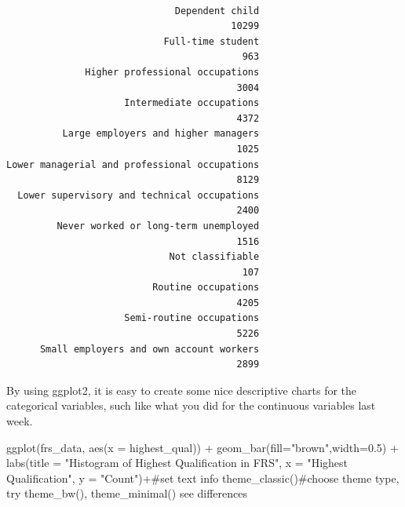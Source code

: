 \documentclass[
  letterpaper,
  DIV=11,
  numbers=noendperiod]{scrreprt}
\newenvironment{Shaded}{\begin{snugshade}}{\end{snugshade}}
\newcommand{\AttributeTok}[1]{\textcolor[rgb]{0.40,0.45,0.13}{#1}}
\newcommand{\CommentTok}[1]{\textcolor[rgb]{0.37,0.37,0.37}{#1}}
\newcommand{\FloatTok}[1]{\textcolor[rgb]{0.68,0.00,0.00}{#1}}
\newcommand{\FunctionTok}[1]{\textcolor[rgb]{0.28,0.35,0.67}{#1}}
\newcommand{\NormalTok}[1]{\textcolor[rgb]{0.00,0.23,0.31}{#1}}
\newcommand{\SpecialCharTok}[1]{\textcolor[rgb]{0.37,0.37,0.37}{#1}}
\newcommand{\StringTok}[1]{\textcolor[rgb]{0.13,0.47,0.30}{#1}}
\begin{document}
\begin{verbatim}

                              Dependent child 
                                        10299 
                            Full-time student 
                                          963 
              Higher professional occupations 
                                         3004 
                     Intermediate occupations 
                                         4372 
          Large employers and higher managers 
                                         1025 
Lower managerial and professional occupations 
                                         8129 
  Lower supervisory and technical occupations 
                                         2400 
         Never worked or long-term unemployed 
                                         1516 
                             Not classifiable 
                                          107 
                          Routine occupations 
                                         4205 
                     Semi-routine occupations 
                                         5226 
      Small employers and own account workers 
                                         2899 
\end{verbatim}

By using ggplot2, it is easy to create some nice descriptive charts for
the categorical variables, such like what you did for the continuous
variables last week.

\begin{Shaded}
\begin{Highlighting}[]
\FunctionTok{ggplot}\NormalTok{(frs\_data, }\FunctionTok{aes}\NormalTok{(}\AttributeTok{x =}\NormalTok{ highest\_qual)) }\SpecialCharTok{+}
  \FunctionTok{geom\_bar}\NormalTok{(}\AttributeTok{fill=}\StringTok{"brown"}\NormalTok{,}\AttributeTok{width=}\FloatTok{0.5}\NormalTok{) }\SpecialCharTok{+}
  \FunctionTok{labs}\NormalTok{(}\AttributeTok{title =} \StringTok{"Histogram of Highest Qualification in FRS"}\NormalTok{, }\AttributeTok{x =} \StringTok{"Highest Qualification"}\NormalTok{, }\AttributeTok{y =} \StringTok{"Count"}\NormalTok{)}\SpecialCharTok{+}\CommentTok{\#set text info}
  \FunctionTok{theme\_classic}\NormalTok{()}\CommentTok{\#choose theme type, try theme\_bw(), theme\_minimal() see differences}
\end{Highlighting}
\end{Shaded}
\end{document}
